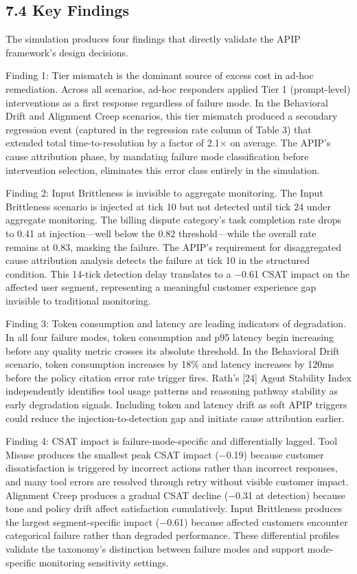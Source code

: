\subsection{7.4  Key Findings}

The simulation produces four findings that directly validate the APIP framework's design decisions.

Finding 1: Tier mismatch is the dominant source of excess cost in ad-hoc remediation. Across all scenarios, ad-hoc responders applied Tier 1 (prompt-level) interventions as a first response regardless of failure mode. In the Behavioral Drift and Alignment Creep scenarios, this tier mismatch produced a secondary regression event (captured in the regression rate column of Table 3) that extended total time-to-resolution by a factor of 2.1$\times$ on average. The APIP's cause attribution phase, by mandating failure mode classification before intervention selection, eliminates this error class entirely in the simulation.

Finding 2: Input Brittleness is invisible to aggregate monitoring. The Input Brittleness scenario is injected at tick 10 but not detected until tick 24 under aggregate monitoring. The billing dispute category's task completion rate drops to 0.41 at injection---well below the 0.82 threshold---while the overall rate remains at 0.83, masking the failure. The APIP's requirement for disaggregated cause attribution analysis detects the failure at tick 10 in the structured condition. This 14-tick detection delay translates to a $-$0.61 CSAT impact on the affected user segment, representing a meaningful customer experience gap invisible to traditional monitoring.

Finding 3: Token consumption and latency are leading indicators of degradation. In all four failure modes, token consumption and p95 latency begin increasing before any quality metric crosses its absolute threshold. In the Behavioral Drift scenario, token consumption increases by 18\% and latency increases by 120ms before the policy citation error rate trigger fires. Rath's [24] Agent Stability Index independently identifies tool usage patterns and reasoning pathway stability as early degradation signals. Including token and latency drift as soft APIP triggers could reduce the injection-to-detection gap and initiate cause attribution earlier.

Finding 4: CSAT impact is failure-mode-specific and differentially lagged. Tool Misuse produces the smallest peak CSAT impact ($-$0.19) because customer dissatisfaction is triggered by incorrect actions rather than incorrect responses, and many tool errors are resolved through retry without visible customer impact. Alignment Creep produces a gradual CSAT decline ($-$0.31 at detection) because tone and policy drift affect satisfaction cumulatively. Input Brittleness produces the largest segment-specific impact ($-$0.61) because affected customers encounter categorical failure rather than degraded performance. These differential profiles validate the taxonomy's distinction between failure modes and support mode-specific monitoring sensitivity settings.

